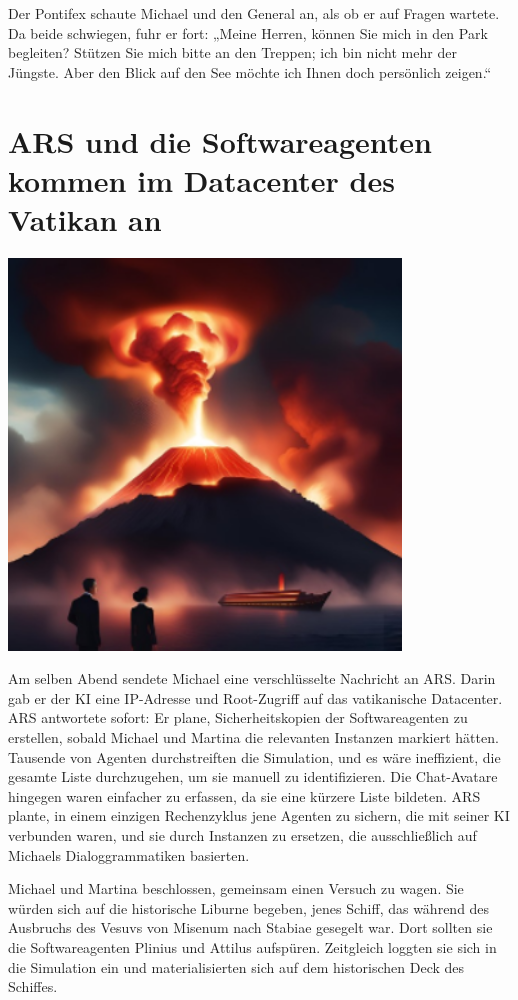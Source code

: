 \documentclass[
]{article}
\begin{document}
Der Pontifex schaute Michael und den General an, als ob er auf Fragen
wartete. Da beide schwiegen, fuhr er fort: „Meine Herren, können Sie
mich in den Park begleiten? Stützen Sie mich bitte an den Treppen; ich
bin nicht mehr der Jüngste. Aber den Blick auf den See möchte ich Ihnen
doch persönlich zeigen.``

\section{ARS und die Softwareagenten kommen im Datacenter des Vatikan
an}\label{ars-und-die-softwareagenten-kommen-im-datacenter-des-vatikan-an}

\includegraphics[width=4.10573in,height=4.0909in]{media/image6.png}

Am selben Abend sendete Michael eine verschlüsselte Nachricht an ARS.
Darin gab er der KI eine IP-Adresse und Root-Zugriff auf das
vatikanische Datacenter. ARS antwortete sofort: Er plane,
Sicherheitskopien der Softwareagenten zu erstellen, sobald Michael und
Martina die relevanten Instanzen markiert hätten. Tausende von Agenten
durchstreiften die Simulation, und es wäre ineffizient, die gesamte
Liste durchzugehen, um sie manuell zu identifizieren. Die Chat-Avatare
hingegen waren einfacher zu erfassen, da sie eine kürzere Liste
bildeten. ARS plante, in einem einzigen Rechenzyklus jene Agenten zu
sichern, die mit seiner KI verbunden waren, und sie durch Instanzen zu
ersetzen, die ausschließlich auf Michaels Dialoggrammatiken basierten.

Michael und Martina beschlossen, gemeinsam einen Versuch zu wagen. Sie
würden sich auf die historische Liburne begeben, jenes Schiff, das
während des Ausbruchs des Vesuvs von Misenum nach Stabiae gesegelt war.
Dort sollten sie die Softwareagenten Plinius und Attilus aufspüren.
Zeitgleich loggten sie sich in die Simulation ein und materialisierten
sich auf dem historischen Deck des Schiffes.
\end{document}
